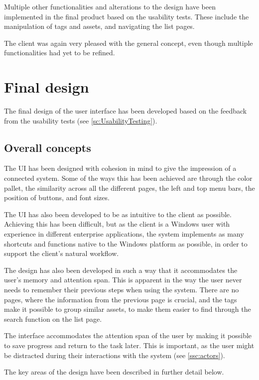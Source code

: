 Multiple other functionalities and alterations to the design have been implemented in the final product based on the usability tests. These include the manipulation of tags and assets, and navigating the list pages.
\par
The client was again very pleased with the general concept, even though multiple functionalities had yet to be refined.

\section{Final design}
The final design of the user interface has been developed based on the feedback from the usability tests (see \autoref{sc:UsabilityTesting}).

\subsection{Overall concepts}
The UI has been designed with cohesion in mind to give the impression of a connected system. Some of the ways this has been achieved are through the color pallet, the similarity across all the different pages, the left and top menu bars, the position of buttons, and font sizes.
\par
The UI has also been developed to be as intuitive to the client as possible. Achieving this has been difficult, but as the client is a Windows user with experience in different enterprise applications, the system implements as many shortcuts and functions native to the Windows platform as possible, in order to support the client's natural workflow.
\par
The design has also been developed in such a way that it accommodates the user's memory and attention span. This is apparent in the way the user never needs to remember their previous steps when using the system. There are no pages, where the information from the previous page is crucial, and the tags make it possible to group similar assets, to make them easier to find through the search function on the list page.
\par
The interface accommodates the attention span of the user by making it possible to save progress and return to the task later. This is important, as the user might be distracted during their interactions with the system (see \autoref{ssc:actors}).
\par
The key areas of the design have been described in further detail below.

